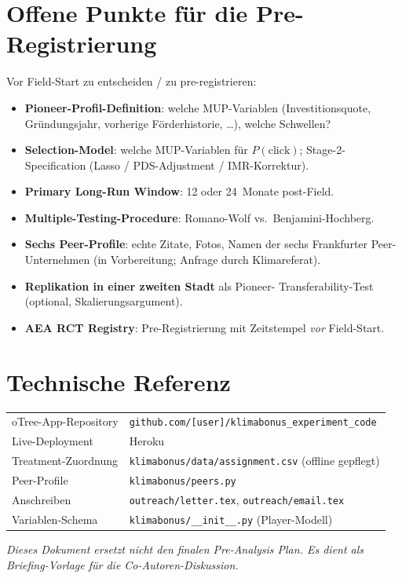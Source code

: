 \documentclass[11pt, a4paper]{scrartcl}
\newcommand{\var}[1]{\texttt{\small #1}}
\begin{document}
\section{Offene Punkte für die Pre-Registrierung}

Vor Field-Start zu entscheiden / zu pre-registrieren:

\begin{itemize}
    \item \textbf{Pioneer-Profil-Definition}: welche MUP-Variablen
        (Investitionsquote, Gründungsjahr, vorherige Förderhistorie,
        \ldots), welche Schwellen?
    \item \textbf{Selection-Model}: welche MUP-Variablen für
        \(P(\text{click})\); Stage-2-Specification (Lasso / PDS-Adjustment
        / IMR-Korrektur).
    \item \textbf{Primary Long-Run Window}: 12 oder 24~Monate post-Field.
    \item \textbf{Multiple-Testing-Procedure}: Romano-Wolf vs.\
        Benjamini-Hochberg.
    \item \textbf{Sechs Peer-Profile}: echte Zitate, Fotos, Namen der
        sechs Frankfurter Peer-Unternehmen (in Vorbereitung; Anfrage durch
        Klimareferat).
    \item \textbf{Replikation in einer zweiten Stadt} als Pioneer-
        Transferability-Test (optional, Skalierungsargument).
    \item \textbf{AEA RCT Registry}: Pre-Registrierung mit Zeitstempel
        \emph{vor} Field-Start.
\end{itemize}

\section*{Technische Referenz}

\noindent
\begin{tabularx}{\linewidth}{@{}lX@{}}
oTree-App-Repository  & \var{github.com/[user]/klimabonus\_experiment\_code} \\
Live-Deployment       & Heroku \\
Treatment-Zuordnung   & \var{klimabonus/data/assignment.csv} (offline gepflegt) \\
Peer-Profile          & \var{klimabonus/peers.py} \\
Anschreiben           & \var{outreach/letter.tex}, \var{outreach/email.tex} \\
Variablen-Schema      & \var{klimabonus/\_\_init\_\_.py} (Player-Modell) \\
\end{tabularx}

\bigskip
\noindent\emph{Dieses Dokument ersetzt nicht den finalen Pre-Analysis Plan.
Es dient als Briefing-Vorlage für die Co-Autoren-Diskussion.}
\end{document}
